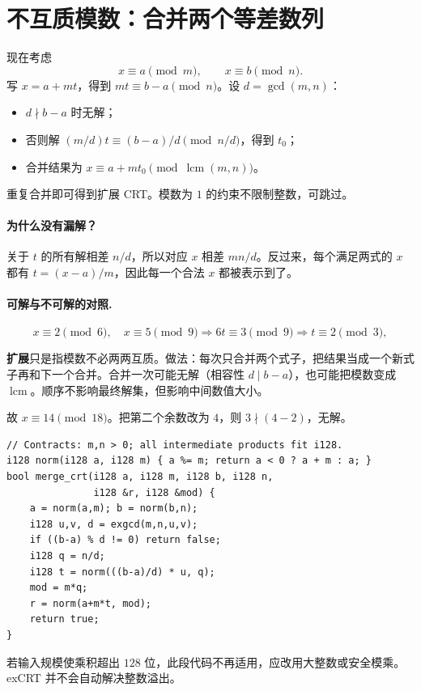 \documentclass[UTF8,a4paper,11pt,twoside,openright,fontset=fandol]{ctexbook}
\theoremstyle{definition}
\newcommand{\lcm}{\operatorname{lcm}}
\begin{document}
\section{不互质模数：合并两个等差数列}
现在考虑
\[
 x\equiv a\pmod m,\qquad x\equiv b\pmod n.
\]
写 $x=a+mt$，得到 $mt\equiv b-a\pmod n$。设 $d=\gcd(m,n)$：
\begin{itemize}
\item $d\nmid b-a$ 时无解；
\item 否则解 $(m/d)t\equiv(b-a)/d\pmod{n/d}$，得到 $t_0$；
\item 合并结果为 $x\equiv a+mt_0\pmod{\lcm(m,n)}$。
\end{itemize}
重复合并即可得到扩展 CRT。模数为 $1$ 的约束不限制整数，可跳过。


\paragraph{为什么没有漏解？}
关于 $t$ 的所有解相差 $n/d$，所以对应 $x$ 相差 $mn/d$。反过来，每个满足两式的 $x$ 都有 $t=(x-a)/m$，因此每一个合法 $x$ 都被表示到了。
\paragraph{可解与不可解的对照.}
\[
 x\equiv2\pmod6,\quad x\equiv5\pmod9
 \Longrightarrow 6t\equiv3\pmod9
 \Longrightarrow t\equiv2\pmod3,
\]

\begin{tip}
\textbf{扩展}只是指模数不必两两互质。做法：每次只合并两个式子，把结果当成一个新式子再和下一个合并。合并一次可能无解（相容性 $d\mid b-a$），也可能把模数变成 $\lcm$。顺序不影响最终解集，但影响中间数值大小。
\end{tip}

故 $x\equiv14\pmod{18}$。把第二个余数改为 $4$，则 $3\nmid(4-2)$，无解。

\begin{lstlisting}
// Contracts: m,n > 0; all intermediate products fit i128.
i128 norm(i128 a, i128 m) { a %= m; return a < 0 ? a + m : a; }
bool merge_crt(i128 a, i128 m, i128 b, i128 n,
               i128 &r, i128 &mod) {
    a = norm(a,m); b = norm(b,n);
    i128 u,v, d = exgcd(m,n,u,v);
    if ((b-a) % d != 0) return false;
    i128 q = n/d;
    i128 t = norm(((b-a)/d) * u, q);
    mod = m*q;
    r = norm(a+m*t, mod);
    return true;
}
\end{lstlisting}
若输入规模使乘积超出 $128$ 位，此段代码不再适用，应改用大整数或安全模乘。exCRT 并不会自动解决整数溢出。
\end{document}
